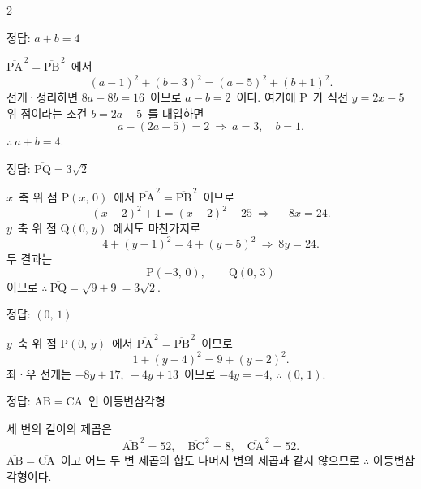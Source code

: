\documentclass[10pt,fleqn]{article}   %
\begin{document}
\dmsoltitlefirsttrue
\begin{multicols*}{2}

\begin{dmanswerbox}
정답: $a+b=4$
\end{dmanswerbox}

$\overline{\mathrm{PA}}^{\,2} = \overline{\mathrm{PB}}^{\,2}$\ 에서
\[ (a-1)^2+(b-3)^2 = (a-5)^2+(b+1)^2. \]
전개·정리하면 $8a - 8b = 16$\ 이므로 $a - b = 2$\ 이다. 여기에 $\mathrm{P}$\ 가 직선 $y=2x-5$ 위 점이라는 조건 $b = 2a - 5$\ 를 대입하면
\[ a - (2a-5) = 2\ \Longrightarrow\ a = 3,\quad b = 1. \]
$\therefore\ a + b = 4$.

\begin{dmanswerbox}
정답: $\overline{\mathrm{PQ}}=3\sqrt{2}$
\end{dmanswerbox}

$x$\ 축 위 점 $\mathrm{P}(x,\,0)$\ 에서 $\overline{\mathrm{PA}}^{\,2}=\overline{\mathrm{PB}}^{\,2}$\ 이므로
\[ (x-2)^2 + 1 = (x+2)^2 + 25\ \Longrightarrow\ -8x = 24. \]
$y$\ 축 위 점 $\mathrm{Q}(0,\,y)$\ 에서도 마찬가지로
\[ 4 + (y-1)^2 = 4 + (y-5)^2\ \Longrightarrow\ 8y = 24. \]
두 결과는
$$\mathrm{P}(-3,\,0),\qquad \mathrm{Q}(0,\,3)$$
이므로 $\therefore\ \overline{\mathrm{PQ}} = \sqrt{9 + 9} = 3\sqrt{2}$.

\begin{dmanswerbox}
정답: $(0,\,1)$
\end{dmanswerbox}

$y$\ 축 위 점 $\mathrm{P}(0,\,y)$\ 에서 $\overline{\mathrm{PA}}^{\,2}=\overline{\mathrm{PB}}^{\,2}$\ 이므로
\[ 1 + (y-4)^2 = 9 + (y-2)^2. \]
좌·우 전개는 $-8y+17,\ -4y+13$\ 이므로 $-4y = -4$, $\therefore\ (0,\,1)$.

\begin{dmanswerbox}
정답: $\overline{\mathrm{AB}}=\overline{\mathrm{CA}}$\ 인 이등변삼각형
\end{dmanswerbox}

세 변의 길이의 제곱은
$$\overline{\mathrm{AB}}^{\,2}=52,\quad \overline{\mathrm{BC}}^{\,2}=8,\quad \overline{\mathrm{CA}}^{\,2}=52.$$
$\overline{\mathrm{AB}}=\overline{\mathrm{CA}}$\ 이고 어느 두 변 제곱의 합도 나머지 변의 제곱과 같지 않으므로 $\therefore$ 이등변삼각형이다.


\end{multicols*}
\end{document}
